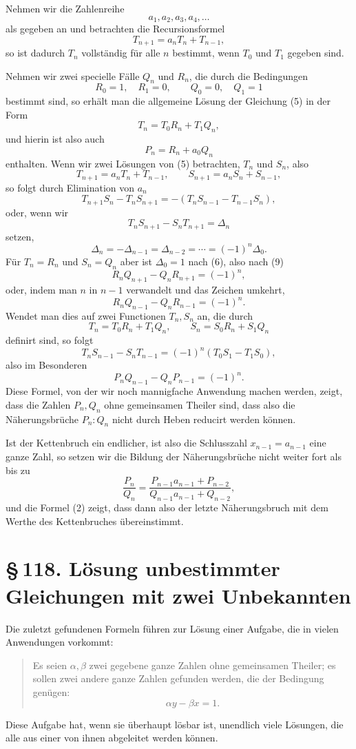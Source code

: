 \documentclass[11pt]{article}
\providecommand{\sect}[2]{\section*{\S\,#1. #2}}
\begin{document}
Nehmen wir die Zahlenreihe
\[
        a_1,a_2,a_3,a_4,\ldots
\]
als gegeben an und betrachten die Recursionsformel
\[
\tag{5}        T_{n+1}=a_nT_n+T_{n-1},
\]
so ist dadurch $T_n$ vollständig für alle $n$ bestimmt, wenn $T_0$ und $T_1$ gegeben sind.

Nehmen wir zwei specielle Fälle $Q_n$ und $R_n$, die durch die Bedingungen
\[
\tag{6}        R_0=1,\quad R_1=0,\qquad Q_0=0,\quad Q_1=1
\]
bestimmt sind, so erhält man die allgemeine Lösung der Gleichung (5) in der Form
\[
\tag{7}        T_n=T_0R_n+T_1Q_n,
\]
und hierin ist also auch
\[
\tag{8}        P_n=R_n+a_0Q_n
\]
enthalten. Wenn wir zwei Lösungen von (5) betrachten, $T_n$ und $S_n$, also
\[
        T_{n+1}=a_nT_n+T_{n-1},\qquad
        S_{n+1}=a_nS_n+S_{n-1},
\]
so folgt durch Elimination von $a_n$
\[
        T_{n+1}S_n-T_nS_{n+1}=-(T_nS_{n-1}-T_{n-1}S_n),
\]
oder, wenn wir
\[
        T_nS_{n+1}-S_nT_{n+1}=\Delta_n
\]
setzen,
\[
\tag{9}        \Delta_n=-\Delta_{n-1}=\Delta_{n-2}=\cdots=(-1)^n\Delta_0.
\]
Für $T_n=R_n$ und $S_n=Q_n$ aber ist $\Delta_0=1$ nach (6), also nach (9)
\[
        R_nQ_{n+1}-Q_nR_{n+1}=(-1)^n,
\]
oder, indem man $n$ in $n-1$ verwandelt und das Zeichen umkehrt,
\[
\tag{10}       R_nQ_{n-1}-Q_nR_{n-1}=(-1)^n.
\]
Wendet man dies auf zwei Functionen $T_n,S_n$ an, die durch
\[
        T_n=T_0R_n+T_1Q_n,
        \qquad
        S_n=S_0R_n+S_1Q_n
\]
definirt sind, so folgt
\[
        T_nS_{n-1}-S_nT_{n-1}=(-1)^n(T_0S_1-T_1S_0),
\]
also im Besonderen
\[
\tag{11}       P_nQ_{n-1}-Q_nP_{n-1}=(-1)^n.
\]
Diese Formel, von der wir noch mannigfache Anwendung machen werden, zeigt, dass die Zahlen $P_n,Q_n$ ohne gemeinsamen Theiler sind, dass also die Näherungsbrüche $P_n:Q_n$ nicht durch Heben reducirt werden können.

Ist der Kettenbruch ein endlicher, ist also die Schlusszahl $x_{n-1}=a_{n-1}$ eine ganze Zahl, so setzen wir die Bildung der Näherungsbrüche nicht weiter fort als bis zu
\[
        \frac{P_n}{Q_n}
        =\frac{P_{n-1}a_{n-1}+P_{n-2}}
               {Q_{n-1}a_{n-1}+Q_{n-2}},
\]
und die Formel (2) zeigt, dass dann also der letzte Näherungsbruch mit dem Werthe des Kettenbruches übereinstimmt.

\sect{118}{Lösung unbestimmter Gleichungen mit zwei Unbekannten}

Die zuletzt gefundenen Formeln führen zur Lösung einer Aufgabe, die in vielen Anwendungen vorkommt:
\begin{quote}
Es seien $\alpha,\beta$ zwei gegebene ganze Zahlen ohne gemeinsamen Theiler; es sollen zwei andere ganze Zahlen gefunden werden, die der Bedingung genügen:
\[
\tag{1}        \alpha y-\beta x=1.
\]
\end{quote}
Diese Aufgabe hat, wenn sie überhaupt lösbar ist, unendlich viele Lösungen, die alle aus einer von ihnen abgeleitet werden können.
\end{document}
